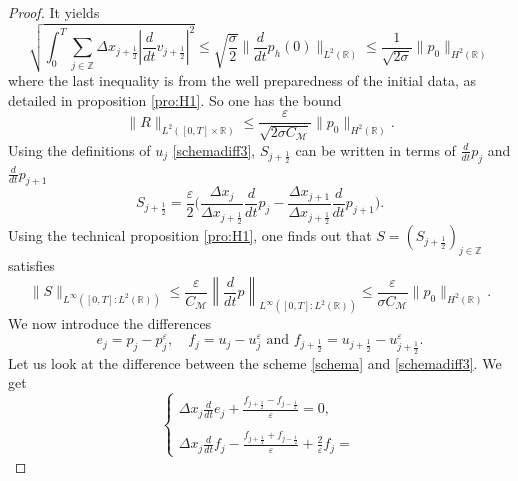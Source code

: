 \documentclass[a4paper,french,english,10pt]{article}
\newcommand\eps{\varepsilon}
\newcommand{\dt}{\partial_t}
\begin{document}
\begin{proof}
{It yields
$$
\sqrt{\int_0^T \sum_{j\in\mathbb{Z}} \Delta x_{j+\frac12} \left| \frac d{dt}v_{j+\frac12}\right|^2 }
\leq
\sqrt{\frac\sigma 2  }
 \bigg\|\frac{d}{dt} p_h(0)\bigg\|_{L^2(\mathbb{R})}\leq \frac{1}{\sqrt{2 \sigma}}
\| p_0\|_{H^2(\mathbb{R})}
$$
where the last inequality is from the well preparedness of the initial data, as detailed in  
proposition \ref{pro:H1}.
So one has the bound
\begin{equation} \label{eq:p5}
\|R\|_{L^2([0,T]\times \mathbb{R})}\leq   \frac{\eps }{ \sqrt{2 \sigma C_{\mathcal{M}} } } 
\| p_0\|_{H^2(\mathbb{R})}.
\end{equation}
}
Using the definitions of $u_j$ \eqref{schemadiff3}, $S_{j+\frac12}$ can be written in terms of $\frac{d}{dt}p_j$ and $\frac{d}{dt}p_{j+1}$
\begin{equation*}
S_{j+\frac12} = \frac{\eps}{2} \bigg( \frac{\Delta x_{j} }{\Delta x_{j+\frac12} }\frac{d}{dt}p_j - \frac{\Delta x_{j+1} }{\Delta x_{j+\frac12} }\frac{d}{dt}p_{j+1} \bigg).
\end{equation*}
Using  the technical proposition \ref{pro:H1}, one finds out that $S = (S_{j+\frac12})_{j\in\mathbb{Z}}$ satisfies
\begin{equation}\label{eq:xx}
\| S \|_{L^\infty([0,T]:L^2(\mathbb{R}))} \leq \frac{ \eps}{C_\mathcal M}
\left\| \frac d{dt}p\right\|_{L^\infty([0,T]: L^2(\mathbb{R}))}
\leq    \frac{ \eps}{\sigma C_\mathcal M}    %
\| p_0\|_{H^2(\mathbb{R})}.
\end{equation}
We now introduce the differences
\begin{equation} \label{eq:eff}
e_j= p_j-p_{j}^{\eps} ,\quad
f_j = u_j-u_j^{\eps} \mbox{ and }
f_{j+\frac12 }= u_{j+\frac12 }-u_{j+\frac12 }^{\eps}.
\end{equation}
Let us  look at the difference between the scheme \eqref{schema} and
\eqref{schemadiff3}. We get
\begin{equation*}\label{diff222}
\left\{
\begin{array}{lll}
\Delta x_j\frac{d}{dt} e_j
+\frac{f_{j+\frac12 }-f_{j-\frac12 }}{\eps}=0,\\
\\
\Delta x_j\frac{d}{dt} f_j
-\frac{f_{j+\frac12 }+f_{j-\frac12 }}{\eps}+\frac{2}{\eps}f_j=

\end{array}
\end{equation*}
\end{proof}
\end{document}
